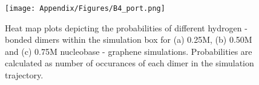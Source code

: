 
\begin{figure}
    \centering
    \texttt{[image: Appendix/Figures/B4\_port.png]}
    \caption[Heat map plots depicting the probabilities of different hydrogen - bonded dimers within the simulation box for 0.25M, 0.50M and 0.75M nucleobase - graphene simulations]{Heat map plots depicting the probabilities of different hydrogen - bonded dimers within the simulation box for (a) 0.25M, (b) 0.50M and (c) 0.75M nucleobase - graphene simulations. Probabilities are calculated as number of occurances of each dimer in the simulation trajectory.}
\end{figure}